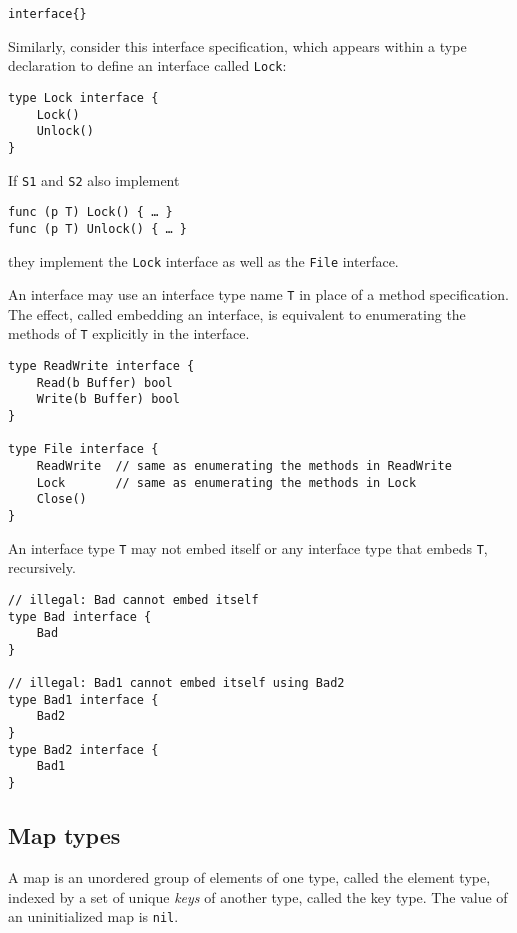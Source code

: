 \begin{Verbatim}[frame=single]
interface{}
\end{Verbatim}

Similarly, consider this interface specification, which appears within a
type declaration to define an interface
called \texttt{Lock}:

\begin{Verbatim}[frame=single]
type Lock interface {
    Lock()
    Unlock()
}
\end{Verbatim}

If \texttt{S1} and \texttt{S2} also implement

\begin{Verbatim}[frame=single]
func (p T) Lock() { … }
func (p T) Unlock() { … }
\end{Verbatim}

they implement the \texttt{Lock} interface as well as the \texttt{File}
interface.

An interface may use an interface type name \texttt{T} in place of a
method specification. The effect, called embedding an interface, is
equivalent to enumerating the methods of \texttt{T} explicitly in the
interface.

\begin{Verbatim}[frame=single]
type ReadWrite interface {
    Read(b Buffer) bool
    Write(b Buffer) bool
}

type File interface {
    ReadWrite  // same as enumerating the methods in ReadWrite
    Lock       // same as enumerating the methods in Lock
    Close()
}
\end{Verbatim}

An interface type \texttt{T} may not embed itself or any interface type
that embeds \texttt{T}, recursively.

\begin{Verbatim}[frame=single]
// illegal: Bad cannot embed itself
type Bad interface {
    Bad
}

// illegal: Bad1 cannot embed itself using Bad2
type Bad1 interface {
    Bad2
}
type Bad2 interface {
    Bad1
}
\end{Verbatim}

\subsection*{Map types}

A map is an unordered group of elements of one type, called the element
type, indexed by a set of unique \emph{keys} of another type, called the
key type. The value of an uninitialized map is \texttt{nil}.

